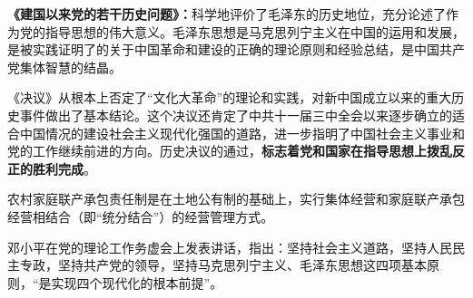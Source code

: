 \textbf{《建国以来党的若干历史问题》：}科学地评价了毛泽东的历史地位，充分论述了作为党的指导思想的伟大意义。毛泽东思想是马克思列宁主义在中国的运用和发展，是被实践证明了的关于中国革命和建设的正确的理论原则和经验总结，是中国共产党集体智慧的结晶。

《决议》从根本上否定了``文化大革命''的理论和实践，对新中国成立以来的重大历史事件做出了基本结论。这个决议还肯定了中共十一届三中全会以来逐步确立的适合中国情况的建设社会主义现代化强国的道路，进一步指明了中国社会主义事业和党的工作继续前进的方向。历史决议的通过，\textbf{标志着党和国家在指导思想上拨乱反正的胜利完成}。

农村家庭联产承包责任制是在土地公有制的基础上，实行集体经营和家庭联产承包经营相结合（即``统分结合''）的经营管理方式。

{邓小平在党的理论工作务虚会上发表讲话，指出：}坚持社会主义道路，坚持人民民主专政，坚持共产党的领导，坚持马克思列宁主义、毛泽东思想这四项基本原则{，``是}实现四个现代化的根本前提''{。}
